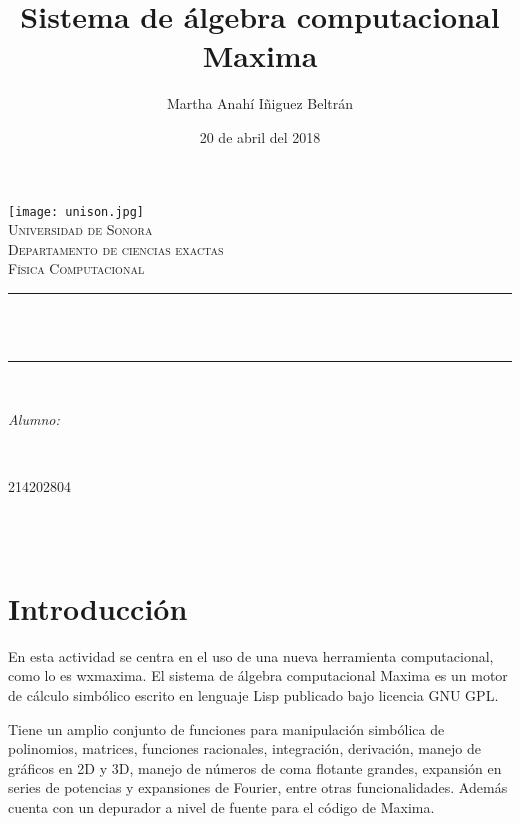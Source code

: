 \documentclass[12pt]{article}
\title{Sistema de álgebra computacional Maxima}								%
\author{Martha Anahí Iñiguez Beltrán}						%
\date{20 de abril del 2018}											%
\makeatletter
\let\thetitle\@title
\let\theauthor\@author
\let\thedate\@date
\makeatother
\begin{document}
\begin{titlepage}
\centering
    \vspace*{0.5 cm}
    \texttt{[image: unison.jpg]}\\[1.0 cm]	%
    \textsc{\LARGE Universidad de Sonora}\\[2.0 cm]	%
    \textsc{\Large Departamento de ciencias exactas}\\[1.0 cm]
\textsc{\Large Física Computacional}\\[0.5 cm]
\rule{\linewidth}{0.2 mm} \\[0.4 cm]
{ \huge \bfseries \thetitle}\\
\rule{\linewidth}{0.2 mm} \\[1.5 cm]
\begin{minipage}{0.6\textwidth}
\begin{flushleft} \large
\emph{Alumno:}\\
\theauthor
\end{flushleft}
\end{minipage}~
\begin{minipage}{0.4\textwidth}
\begin{flushright} \large
214202804
\end{flushright}
\end{minipage}\\[2 cm]


{\large \thedate}\\[2 cm]

\vfill

\end{titlepage}

\tableofcontents
\pagebreak
\section{Introducción}

En esta actividad se centra en el uso de una nueva herramienta computacional, como lo es wxmaxima. El sistema de álgebra computacional Maxima es un motor de cálculo simbólico escrito en lenguaje Lisp publicado bajo licencia GNU GPL.

Tiene un amplio conjunto de funciones para manipulación simbólica de polinomios, matrices, funciones racionales, integración, derivación, manejo de gráficos en 2D y 3D, manejo de números de coma flotante grandes, expansión en series de potencias y expansiones de Fourier, entre otras funcionalidades. Además cuenta con un depurador a nivel de fuente para el código de Maxima.
\end{document}
